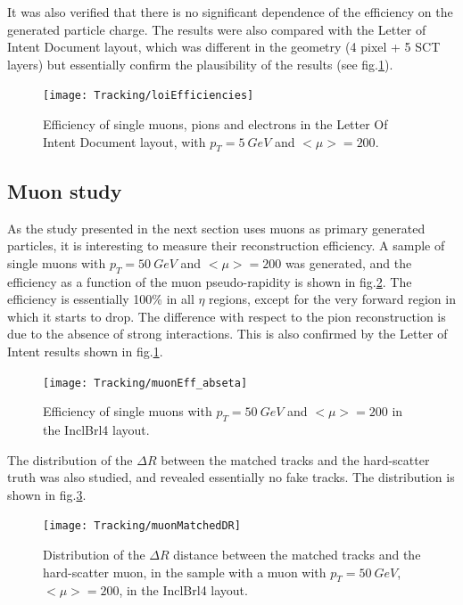 \documentclass[a4paper,twoside,12pt]{article}
\begin{document}
It was also verified that there is no significant dependence of the efficiency on the generated particle charge. The results were also compared with
the Letter of Intent Document\cite{loi} layout, which was different in the geometry (4 pixel + 5 SCT layers) but essentially confirm the plausibility of the results (see fig.\ref{fig:tracking:loiEfficiencies}).

\begin{figure}
\centering
\texttt{[image: Tracking/loiEfficiencies]}
\caption{Efficiency of single muons, pions and electrons in the Letter Of Intent Document\cite{loi} layout, with $p_{T} = 5\ GeV$ and $<\mu> = 200$.}
\label{fig:tracking:loiEfficiencies}
\end{figure} 


\subsection{Muon study}
As the study presented
in the next section uses muons as primary generated particles, it is interesting to measure their reconstruction efficiency. A sample of 
single muons with $p_{T} = 50\ GeV$ and $<\mu> = 200$ was generated, and the efficiency as a function of the muon pseudo-rapidity is
shown in fig.\ref{fig:tracking:muonEff_abseta}. The efficiency is essentially 100\% in all $\eta$ regions, except for the very forward region in which it starts to drop.
The difference with respect to the pion reconstruction is due to the absence of strong interactions. This is also confirmed by the Letter of Intent\cite{loi} results shown in fig.\ref{fig:tracking:loiEfficiencies}.\\

\begin{figure}
\centering
\texttt{[image: Tracking/muonEff\_abseta]}
\caption{Efficiency of single muons with $p_{T} = 50\ GeV$ and $<\mu> = 200$ in the InclBrl4 layout.}
\label{fig:tracking:muonEff_abseta}
\end{figure} 

The distribution of the $\Delta R$ between the matched tracks and the hard-scatter truth was also studied, and revealed essentially no fake tracks. The distribution is
shown in fig.\ref{fig:tracking:muonMatchedDR}.\\

\begin{figure}
\centering
\texttt{[image: Tracking/muonMatchedDR]}
\caption{Distribution of the $\Delta R$ distance between the matched tracks and the hard-scatter muon, in the sample with a muon with $p_{T} = 50\ GeV$, $<\mu> = 200$, in the InclBrl4 layout.}
\label{fig:tracking:muonMatchedDR}
\end{figure} 
\end{document}

